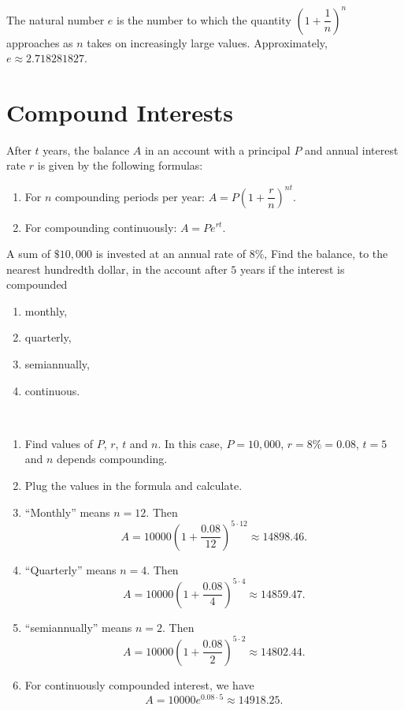 \documentclass[en,12pt]{elegantbook}
\providecommand{\tightlist}{%
  \setlength{\itemsep}{0pt}\setlength{\parskip}{0pt}}
\let\BeginKnitrBlock\begin \let\EndKnitrBlock\end
\begin{document}
The natural number \(e\) is the number to which the quantity \(\left(1+\dfrac1n\right)^n\) approaches as \(n\) takes on increasingly large values. Approximately, \(e\approx2.718281827\).

\hypertarget{compound-interests}{%
\section{Compound Interests}\label{compound-interests}}

After \(t\) years, the balance \(A\) in an account with a principal \(P\) and annual interest rate \(r\) is given by the following formulas:

\begin{enumerate}
\def\labelenumi{\arabic{enumi}.}
\tightlist
\item
  For \(n\) compounding periods per year: \(A=P\left(1+\dfrac{r}{n}\right)^{nt}\).
\item
  For compounding continuously: \(A=Pe^{rt}\).
\end{enumerate}

\BeginKnitrBlock{example}
\protect\hypertarget{exm:unnamed-chunk-300}{}{\label{exm:unnamed-chunk-300} }
A sum of \(\$10,000\) is invested at an annual rate of \(8\%\), Find the balance, to the nearest hundredth dollar, in the account after \(5\) years if the interest is compounded

\begin{enumerate}
\def\labelenumi{\arabic{enumi}.}
\tightlist
\item
  monthly,
\item
  quarterly,
\item
  semiannually,
\item
  continuous.
\end{enumerate}
\EndKnitrBlock{example}

\BeginKnitrBlock{solution}
{}\\

\begin{enumerate}
\def\labelenumi{\arabic{enumi}.}
\tightlist
\item
  Find values of \(P\), \(r\), \(t\) and \(n\). In this case, \(P=10,000\), \(r=8\%=0.08\), \(t=5\) and \(n\) depends compounding.
\item
  Plug the values in the formula and calculate.
\item
  ``Monthly'' means \(n=12\). Then
  \[
   A=10000\left(1+\frac{0.08}{12}\right)^{5\cdot 12}\approx 14898.46.
   \]
\item
  ``Quarterly'' means \(n=4\). Then
  \[
   A=10000\left(1+\frac{0.08}{4}\right)^{5\cdot 4}\approx 14859.47.
   \]
\item
  ``semiannually'' means \(n=2\). Then
  \[
   A=10000\left(1+\frac{0.08}{2}\right)^{5\cdot 2}\approx 14802.44.
   \]
\item
  For continuously compounded interest, we have
  \[
   A=10000e^{0.08\cdot 5}\approx 14918.25.
   \]
\end{enumerate}
\EndKnitrBlock{solution}
\end{document}
